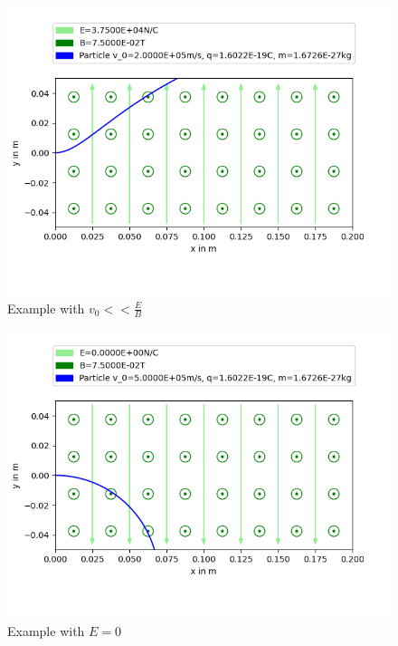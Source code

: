 \documentclass[english, a4paper, 10pt]{article}
\begin{document}
\begin{figure}[ht]
\caption{Example with $v_0<<\frac{E}{B}$}
\centering
\includegraphics[width=\textwidth]{figure_5}
\end{figure}
\begin{figure}[ht]
\caption{Example with $E=0$}
\centering
\includegraphics[width=\textwidth]{figure_6}
\end{figure}
\end{document}
